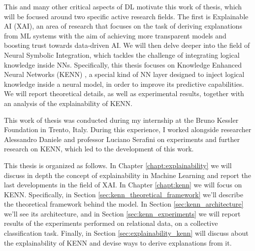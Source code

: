 This and many other critical aspects of DL motivate this work of thesis, which will be focused around two specific active research fields. The first is Explainable AI (XAI), an area of research that focuses on the task of deriving explanations from ML systems with the aim of achieving more transparent models and boosting trust towards data-driven AI. We will then delve deeper into the field of Neural Symbolic Integration, which tackles the challenge of integrating logical knowledge inside NNs. Specifically, this thesis focuses on Knowledge Enhanced Neural Networks (KENN) \cite{daniele2019kenn}, a special kind of NN layer designed to inject logical knowledge inside a neural model, in order to improve its predictive capabilities. We will report theoretical details, as well as experimental results, together with an analysis of the explainability of KENN.

This work of thesis was conducted during my internship at the Bruno Kessler Foundation in Trento, Italy. During this experience, I worked alongside researcher Alessandro Daniele and professor Luciano Serafini on experiments and further research on KENN, which led to the development of this work.

This thesis is organized as follows. In Chapter \ref{chapt:explainability} we will discuss in depth the concept of explainability in Machine Learning and report the last developments in the field of XAI. In Chapter \ref{chapt:kenn} we will focus on KENN. Specifically, in Section \ref{sec:kenn_theoretical_framework} we'll describe the theoretical framework behind the model. In Section \ref{sec:kenn_architecture} we'll see its architecture, and in Section \ref{sec:kenn_experiments} we will report results of the experiments performed on relational data, on a collective classification task. Finally, in Section \ref{sec:explainability_kenn} will discuss about the explainability of KENN and devise ways to derive explanations from it.

